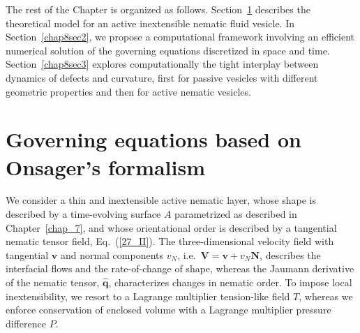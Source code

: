 The rest of the Chapter is organized as follows. Section~\ref{chap8sec1}  describes the theoretical model for an active inextensible nematic fluid vesicle.  In Section~\ref{chap8sec2}, we propose a computational framework involving an efficient numerical solution of the governing equations discretized in space and time. Section~\ref{chap8sec3} explores computationally the tight interplay between dynamics of defects and curvature, first for passive vesicles with different geometric properties and then for active nematic vesicles. %


\section{Governing equations based on Onsager's formalism}\label{chap8sec1}

We consider a thin and inextensible active nematic layer, whose shape is described by a time-evolving surface $A$ parametrized as described in Chapter~\ref{chap_7}, and whose orientational order is described by a tangential nematic tensor field, Eq.~(\ref{27_II}). The three-dimensional velocity field with tangential $\bm{v}$ and normal components $v_{N}$, i.e.~$\bm{V} = \bm{v} + v_{N}\bm{N}$, describes the interfacial flows and the rate-of-change of shape, whereas the Jaumann derivative  of the nematic tensor, $\widehat{\bm{q}}$, characterizes changes in nematic order. To impose local inextensibility, we resort to a Lagrange multiplier tension-like field $T$, whereas we enforce conservation of enclosed volume with a Lagrange multiplier pressure difference $P$.




